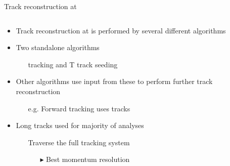 \documentclass[aspectratio=1610]{beamer}
\begin{document}
\begin{frame}{Track reconstruction at \lhcb}

\begin{columns}
\begin{column}{0.5\textwidth}
\begin{itemize}
\item Track reconstruction at \lhcb is performed by several different algorithms
\end{itemize}
\begin{itemize}
\item Two standalone algorithms 
  \begin{itemize}
    \item[\ding{70}] \velo tracking and T track seeding
  \end{itemize}
\item Other algorithms use input from these to perform further track reconstruction
  \begin{itemize}
    \item[\ding{70}] e.g. Forward tracking uses \velo tracks
  \end{itemize}
\end{itemize}
\begin{itemize}
\item Long tracks used for majority of \lhcb analyses
  \begin{itemize}
    \item[\ding{70}] Traverse the full tracking system
    \begin{itemize}
    \item[$\blacktriangleright$] Best momentum resolution
    \end{itemize}
  \end{itemize}
\end{itemize}
\end{column}
\begin{column}{0.5\textwidth}
\end{column}
\end{columns}
\end{frame}
\end{document}
